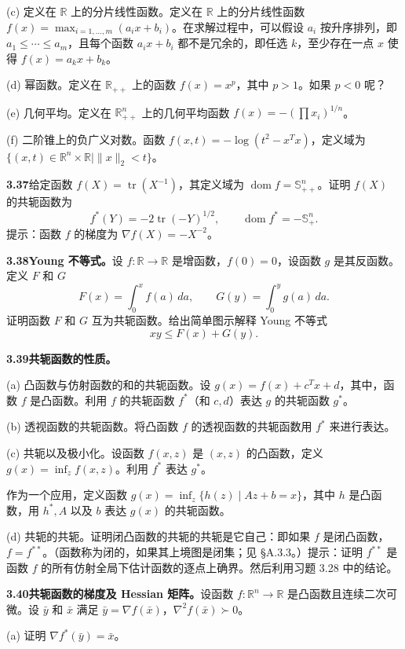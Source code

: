 \documentclass[UTF8, 12pt, fontset=fandol, oneside]{ctexart}
\DeclareMathOperator{\dom}{dom}
\begin{document}
(c) 定义在 $\mathbb{R}$ 上的分片线性函数。定义在 $\mathbb{R}$ 上的分片线性函数 $f(x)=\max_{i=1,\ldots,m}(a_ix+b_i)$。在求解过程中，可以假设 $a_i$ 按升序排列，即 $a_1\leq\cdots\leq a_m$，且每个函数 $a_ix+b_i$ 都不是冗余的，即任选 $k$，至少存在一点 $x$ 使得 $f(x)=a_kx+b_k$。

(d) 幂函数。定义在 $\mathbb{R}_{++}$ 上的函数 $f(x)=x^p$，其中 $p>1$。如果 $p<0$ 呢？

(e) 几何平均。定义在 $\mathbb{R}_{++}^n$ 上的几何平均函数 $f(x)=-(\prod x_i)^{1/n}$。

(f) 二阶锥上的负广义对数。函数 $f(x,t)=-\log(t^2-x^Tx)$，定义域为 $\{(x,t)\in\mathbb{R}^n\times\mathbb{R}\mid \|x\|_2<t\}$。

\noindent\textbf{3.37}\quad 给定函数 $f(X)=\operatorname{tr}(X^{-1})$，其定义域为 $\dom f=\mathbb{S}_{++}^n$。证明 $f(X)$ 的共轭函数为
\[
f^*(Y)=-2\operatorname{tr}(-Y)^{1/2},\qquad \dom f^*=-\mathbb{S}_+^n.
\]
提示：函数 $f$ 的梯度为 $\nabla f(X)=-X^{-2}$。

\noindent\textbf{3.38\quad Young 不等式。}\quad 设 $f:\mathbb{R}\to\mathbb{R}$ 是增函数，$f(0)=0$，设函数 $g$ 是其反函数。定义 $F$ 和 $G$
\[
F(x)=\int_0^x f(a)\,da,\qquad
G(y)=\int_0^y g(a)\,da.
\]
证明函数 $F$ 和 $G$ 互为共轭函数。给出简单图示解释 Young 不等式
\[
xy\leq F(x)+G(y).
\]

\noindent\textbf{3.39\quad 共轭函数的性质。}

(a) 凸函数与仿射函数的和的共轭函数。设 $g(x)=f(x)+c^Tx+d$，其中，函数 $f$ 是凸函数。利用 $f$ 的共轭函数 $f^*$（和 $c,d$）表达 $g$ 的共轭函数 $g^*$。

(b) 透视函数的共轭函数。将凸函数 $f$ 的透视函数的共轭函数用 $f^*$ 来进行表达。

(c) 共轭以及极小化。设函数 $f(x,z)$ 是 $(x,z)$ 的凸函数，定义 $g(x)=\inf_z f(x,z)$。利用 $f^*$ 表达 $g^*$。

作为一个应用，定义函数 $g(x)=\inf_z\{h(z)\mid Az+b=x\}$，其中 $h$ 是凸函数，用 $h^*,A$ 以及 $b$ 表达 $g(x)$ 的共轭函数。

(d) 共轭的共轭。证明闭凸函数的共轭的共轭是它自己：即如果 $f$ 是闭凸函数，$f=f^{**}$。（函数称为闭的，如果其上境图是闭集；见 \S A.3.3。）提示：证明 $f^{**}$ 是函数 $f$ 的所有仿射全局下估计函数的逐点上确界。然后利用习题 3.28 中的结论。

\noindent\textbf{3.40\quad 共轭函数的梯度及 Hessian 矩阵。}\quad 设函数 $f:\mathbb{R}^n\to\mathbb{R}$ 是凸函数且连续二次可微。设 $\bar y$ 和 $\bar x$ 满足 $\bar y=\nabla f(\bar x)$，$\nabla^2 f(\bar x)\succ0$。

(a) 证明 $\nabla f^*(\bar y)=\bar x$。
\end{document}

